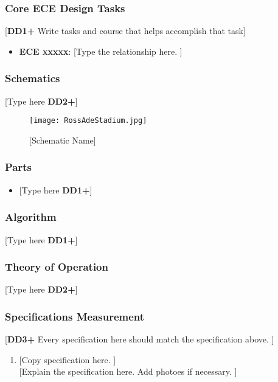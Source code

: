 \documentclass[letterpaper, 11pt]{article}
\begin{document}
\subsubsection{Core ECE Design Tasks}
[\textbf{DD1+} Write tasks and course that helps accomplish that task]
\begin{itemize}
    \item \textbf{ECE xxxxx}: [Type the relationship here. ]
\end{itemize}

\subsubsection{Schematics}
[Type here \textbf{DD2+}]
\begin{figure}[h]
    \centering
    \texttt{[image: RossAdeStadium.jpg]} %
    \caption{[Schematic Name]}
\end{figure} %

\subsubsection{Parts}
\begin{itemize}
    \item {[Type here \textbf{DD1+}]}
\end{itemize}

\subsubsection{Algorithm}
[Type here \textbf{DD1+}]

\subsubsection{Theory of Operation}
[Type here \textbf{DD2+}]
\subsubsection{Specifications Measurement}
[\textbf{DD3+} Every specification here should match the specification above. ]
\begin{enumerate}
    \item {[Copy specification here. ]} \\
    {[Explain the specification here. Add photoes if necessary. ]}
\end{enumerate}
\end{document}
